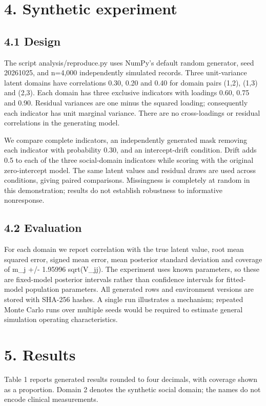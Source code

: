 \documentclass[11pt,a4paper]{article}
\begin{document}
\section*{4. Synthetic experiment}
\subsection*{4.1 Design}
The script analysis/reproduce.py uses NumPy's default random generator, seed 20261025, and n=4,000 independently simulated records. Three unit-variance latent domains have correlations 0.30, 0.20 and 0.40 for domain pairs (1,2), (1,3) and (2,3). Each domain has three exclusive indicators with loadings 0.60, 0.75 and 0.90. Residual variances are one minus the squared loading; consequently each indicator has unit marginal variance. There are no cross-loadings or residual correlations in the generating model.

We compare complete indicators, an independently generated mask removing each indicator with probability 0.30, and an intercept-drift condition. Drift adds 0.5 to each of the three social-domain indicators while scoring with the original zero-intercept model. The same latent values and residual draws are used across conditions, giving paired comparisons. Missingness is completely at random in this demonstration; results do not establish robustness to informative nonresponse.

\subsection*{4.2 Evaluation}
For each domain we report correlation with the true latent value, root mean squared error, signed mean error, mean posterior standard deviation and coverage of m\_j +/- 1.95996 sqrt(V\_jj). The experiment uses known parameters, so these are fixed-model posterior intervals rather than confidence intervals for fitted-model population parameters. All generated rows and environment versions are stored with SHA-256 hashes. A single run illustrates a mechanism; repeated Monte Carlo runs over multiple seeds would be required to estimate general simulation operating characteristics.

\section*{5. Results}
Table 1 reports generated results rounded to four decimals, with coverage shown as a proportion. Domain 2 denotes the synthetic social domain; the names do not encode clinical measurements.
\end{document}
